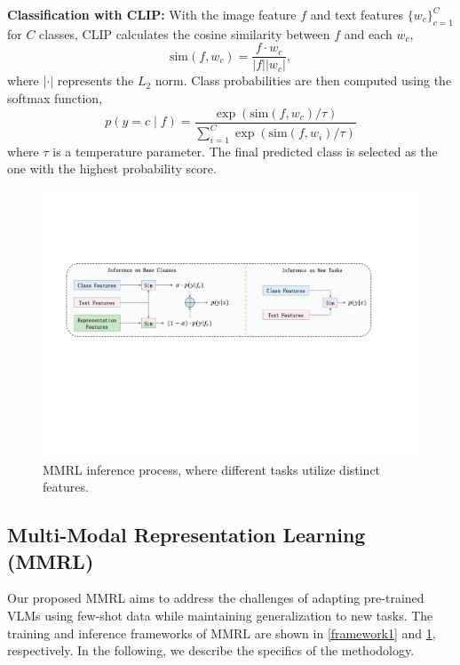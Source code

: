 \noindent \textbf{Classification with CLIP:} With the image feature $f$ and text features $\{w_c\}_{c=1}^C$ for $C$ classes, CLIP calculates the cosine similarity between $f$ and each $w_c$,
\begin{equation} 
    \text{sim}(f, w_c) = \frac{f \cdot w_c}{|f| |w_c|}, \nonumber 
\end{equation} 
where $|\cdot|$ represents the $L_2$ norm. Class probabilities are then computed using the softmax function,
\begin{equation} 
    p(y = c \mid f) = \frac{\exp(\text{sim}(f, w_c) / \tau)}{\sum_{i=1}^{C} \exp(\text{sim}(f, w_i) / \tau)} \nonumber 
\end{equation} 
where $\tau$ is a temperature parameter. The final predicted class is selected as the one with the highest probability score.



\begin{figure}[tb]
\setlength{\abovecaptionskip}{0.2cm}   %
\setlength{\belowcaptionskip}{-0.4cm}   %
\centering
\setlength{\belowcaptionskip}{-0.39cm}   %
  \includegraphics[width=0.7\linewidth]{fig/frame2.pdf}
  \caption{MMRL inference process, where different tasks utilize distinct features.}
  \label{framework2}
\end{figure}


\subsection{Multi-Modal Representation Learning (MMRL)} Our proposed MMRL aims to address the challenges of adapting pre-trained VLMs using few-shot data while maintaining generalization to new tasks. The training and inference frameworks of MMRL are shown in \cref{framework1} and \cref{framework2}, respectively. In the following, we describe the specifics of the methodology.


